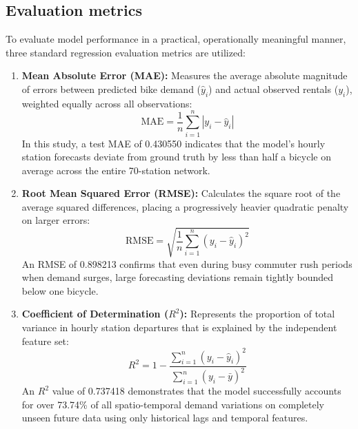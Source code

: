 \documentclass[12pt, a4paper]{article}
\renewcommand{\_}{\textunderscore\allowbreak}
\begin{document}
\subsection{Evaluation metrics}
To evaluate model performance in a practical, operationally meaningful manner, three standard regression evaluation metrics are utilized:
\begin{enumerate}
    \item \textbf{Mean Absolute Error (MAE):} Measures the average absolute magnitude of errors between predicted bike demand ($\hat{y}_i$) and actual observed rentals ($y_i$), weighted equally across all observations:
    \begin{equation}
        \text{MAE} = \frac{1}{n} \sum_{i=1}^{n} |y_i - \hat{y}_i|
    \end{equation}
    In this study, a test MAE of 0.430550 indicates that the model's hourly station forecasts deviate from ground truth by less than half a bicycle on average across the entire 70-station network.
    \item \textbf{Root Mean Squared Error (RMSE):} Calculates the square root of the average squared differences, placing a progressively heavier quadratic penalty on larger errors:
    \begin{equation}
        \text{RMSE} = \sqrt{\frac{1}{n} \sum_{i=1}^{n} (y_i - \hat{y}_i)^2}
    \end{equation}
    An RMSE of 0.898213 confirms that even during busy commuter rush periods when demand surges, large forecasting deviations remain tightly bounded below one bicycle.
    \item \textbf{Coefficient of Determination ($R^2$):} Represents the proportion of total variance in hourly station departures that is explained by the independent feature set:
    \begin{equation}
        R^2 = 1 - \frac{\sum_{i=1}^{n} (y_i - \hat{y}_i)^2}{\sum_{i=1}^{n} (y_i - \bar{y})^2}
    \end{equation}
    An $R^2$ value of 0.737418 demonstrates that the model successfully accounts for over 73.74\% of all spatio-temporal demand variations on completely unseen future data using only historical lags and temporal features.
\end{enumerate}
\end{document}
